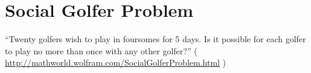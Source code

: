 \section{Social Golfer Problem}

``Twenty golfers wish to play in foursomes for 5 days. Is it possible for each golfer to play no more than once with any other golfer?''
( \url{http://mathworld.wolfram.com/SocialGolferProblem.html} )




